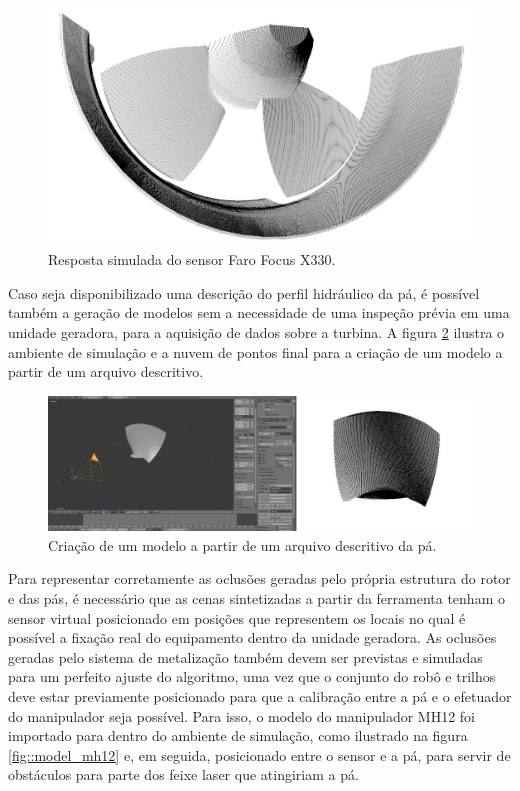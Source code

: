  \begin{figure}[H]
	\centering
	\includegraphics[width=0.9\columnwidth]{method/figs/calibracao/blensor_faro}
	\caption{Resposta simulada do sensor Faro Focus X330.}
    \label{fig::blensor_faro}
\end{figure}	


Caso seja disponibilizado uma descrição do perfil hidráulico da pá, é possível
também a geração de modelos sem a necessidade de uma inspeção prévia em uma
unidade geradora, para a aquisição de
dados sobre a turbina. A figura \ref{fig::modelo_pa} ilustra o ambiente de simulação e a
nuvem de pontos final para a criação de um modelo a partir de um arquivo
descritivo. 


\begin{figure}[h!]
	\centering
	\includegraphics[width=0.9\columnwidth]{method/figs/calibracao/blensor_pa_sim}
	\caption{Criação de um modelo a partir de um arquivo descritivo da pá.}
    \label{fig::modelo_pa}
\end{figure}

Para representar corretamente as oclusões geradas pelo própria estrutura do
rotor e das pás, é necessário que as cenas sintetizadas a partir da ferramenta
tenham o sensor virtual posicionado em posições que representem os locais no
qual é possível a fixação real do equipamento dentro da unidade geradora. As
oclusões geradas pelo sistema de metalização também devem ser previstas e simuladas para um
perfeito ajuste do algoritmo, uma vez que o conjunto do robô e trilhos deve
estar previamente posicionado para que a calibração entre a pá e o efetuador do
manipulador seja possível. Para isso, o modelo do manipulador MH12 foi
importado para dentro do ambiente de simulação, como ilustrado na figura
\ref{fig::model_mh12} e, em seguida, posicionado entre o sensor e a pá, para
servir de obstáculos para parte dos feixe laser que atingiriam a pá.


